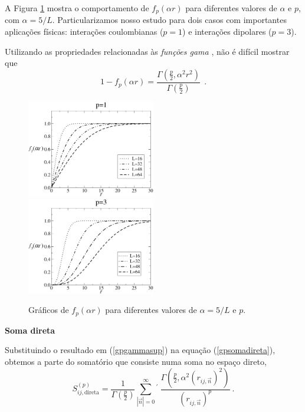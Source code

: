 \documentclass[twocolumn,a4,11pt]{article}
\begin{document}
A Figura \ref{fp} mostra o comportamento de $f_{p}(\alpha r)$ para diferentes valores de $\alpha$ e $p$, com $\alpha=5/L$. Particularizamos nosso estudo para dois casos com importantes aplicações físicas: interações coulombianas ($p=1$) e interações dipolares ($p=3$).

Utilizando as propriedades relacionadas às {\it funções gama} \cite{GRAD}, não é difícil mostrar que
\begin{equation}
1-f_{p}(\alpha r)= \frac{\Gamma\left(\frac{p}{2},\alpha^{2} r^{2}\right)}{\Gamma\left(\frac{p}{2}\right)} ~~ .
\label{gpgammasup}
\end{equation}

\vspace{0.2cm}

\begin{figure}[!ht]
\centering
\includegraphics[width=0.5\textwidth]{p1}
\includegraphics[width=0.5\textwidth]{p3}
\renewcommand{\figurename}{Figura}
\caption{ {\small Gráficos de $f_{p}(\alpha r)$ para diferentes valores de $\alpha=5/L$ e $p$.}}
\label{fp}
\end{figure}

\noindent
{\bf Soma direta}

Substituindo o resultado em (\ref{gpgammasup}) na equação (\ref{gpsomadireta}), obtemos a parte do somatório que consiste numa soma no espaço direto,
\begin{equation}
S_{ij,\text{direta}}^{(p)}=\frac{1}{\Gamma\left(\frac{p}{2}\right) }  \sum_{|\vec{n}|=0}^{\infty} {}^{\prime} ~
\frac{\Gamma\left(\frac{p}{2},\alpha^{2} (r_{ij,\vec{n}})^{2}\right)}
{ (r_{ij,\vec{n}})^{p} }~ .
\label{somadireta}
\end{equation}
\end{document}
